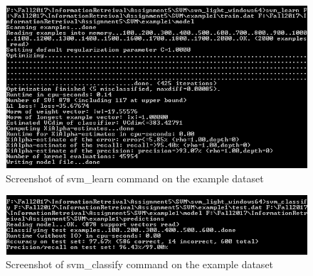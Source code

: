 \documentclass[12pt]{report}
\begin{document}
\begin{figure}[ht]
  \centering
  \includegraphics[width=1\textwidth]{SVM/svm_learn.png}
  \caption{Screenshot of svm\_learn command on the example dataset}
  \label{fig:1}
\end{figure}

\begin{figure}[ht]
  \centering
  \includegraphics[width=1\textwidth]{SVM/svm_classify.png}
  \caption{Screenshot of svm\_classify command on the example dataset}
  \label{fig:1}
\end{figure}
\end{document}
